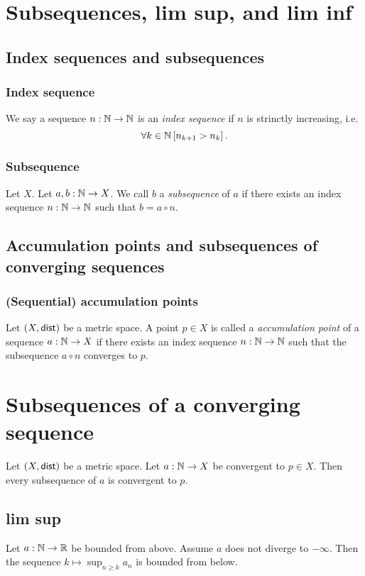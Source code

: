 \section{Subsequences, lim sup, and lim inf}


\subsection{Index sequences and subsequences}
\subsubsection*{Index sequence}
\udef We say a sequence $n : \mathbb{N} \to \mathbb{N}$ is an \emph{index sequence}
if $n$ is strinctly increasing, i.e.
\[
    \forall k \in \mathbb{N} \left[ n_{k+1} > n_k \right].
\]

\subsubsection*{Subsequence}
\udef Let $X$. Let $a,b : \mathbb{N} \to X$. We call $b$ a \emph{subsequence} of $a$
if there exists an index sequence $n : \mathbb{N} \to \mathbb{N}$ such that $b = a \circ n$.

\subsection{Accumulation points and subsequences of converging sequences}
\subsubsection*{(Sequential) accumulation points}
\udef Let $(X, \mathsf{dist})$ be a metric space. A point $p \in X$ is called
a \emph{accumulation point} of a sequence $a : \mathbb{N} \to X$ if there exists
an index sequence $n : \mathbb{N} \to \mathbb{N}$ such that the subsequence $a \circ n$
converges to $p$. 

\section{Subsequences of a converging sequence}
\uprop Let $(X, \mathsf{dist})$ be a metric space. Let $a : \mathbb{N} \to X$ be convergent to
$p \in X$. Then every subsequence of $a$ is convergent to $p$.


\subsection{lim sup}
\ulem Let $a : \mathbb{N} \to \mathbb{R}$ be bounded from above. Assume $a$ does not diverge
to $-\infty$. Then the sequence $k \mapsto \sup_{n \geq k} a_n$ is bounded
from below.

